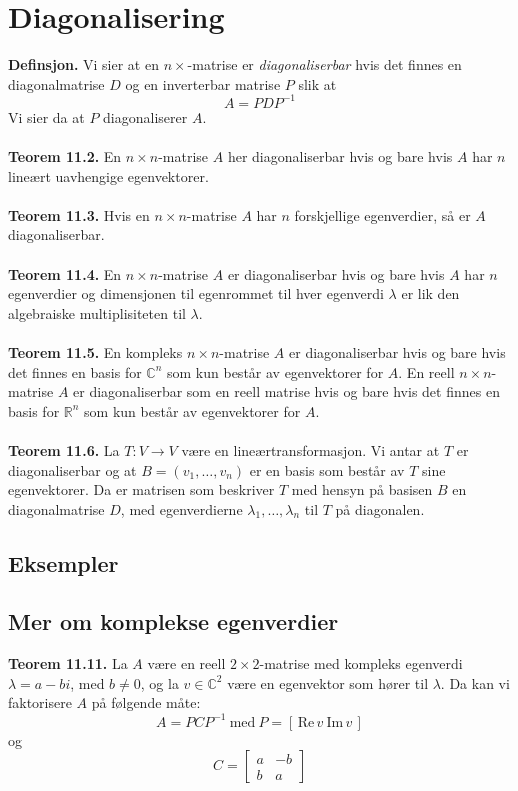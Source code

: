 \documentclass{article}
\begin{document}
\section{Diagonalisering}
\textbf{Definsjon.} Vi sier at en $n \times $-matrise er \textit{diagonaliserbar} hvis det finnes en diagonalmatrise $D$ og en inverterbar matrise $P$ slik at
\[ A = PDP^{-1} \]
Vi sier da at $P$ diagonaliserer $A$.
\\\\
\textbf{Teorem 11.2.} En $n \times n$-matrise $A$ her diagonaliserbar hvis og bare hvis $A$ har $n$ lineært uavhengige egenvektorer.
\\\\
\textbf{Teorem 11.3.} Hvis en $n \times n$-matrise $A$ har $n$ forskjellige egenverdier, så er $A$ diagonaliserbar.
\\\\
\textbf{Teorem 11.4.} En $n \times n$-matrise $A$ er diagonaliserbar hvis og bare hvis $A$ har $n$ egenverdier og dimensjonen til egenrommet til hver egenverdi $\lambda$ er lik den algebraiske multiplisiteten til $\lambda$.
\\\\
\textbf{Teorem 11.5.} En kompleks $n \times n$-matrise $A$ er diagonaliserbar hvis og bare hvis det finnes en basis for $\mathbb{C}^n$ som kun består av egenvektorer for $A$. En reell $n \times n$-matrise $A$ er diagonaliserbar som en reell matrise hvis og bare hvis det finnes en basis for $\mathbb{R}^n$ som kun består av egenvektorer for $A$.
\\\\
\textbf{Teorem 11.6.} La $T: V \rightarrow V$ være en lineærtransformasjon. Vi antar at $T$ er diagonaliserbar og at $B = (v_1, \dots, v_n)$ er en basis som består av $T$ sine egenvektorer. Da er matrisen som beskriver $T$ med hensyn på basisen $B$ en diagonalmatrise $D$, med egenverdierne $\lambda_1, \dots, \lambda_n$ til $T$ på diagonalen.


\subsection{Eksempler}


\subsection{Mer om komplekse egenverdier}
\textbf{Teorem 11.11.} La $A$ være en reell $2 \times 2$-matrise med kompleks egenverdi $\lambda = a - bi$, med $b \neq 0$, og la $v \in \mathbb{C}^2$ være en egenvektor som hører til $\lambda$. Da kan vi faktorisere $A$ på følgende måte:
\[ A = PCP^{-1} \ \text{med} \ P = [\, \text{Re}\,v \ \text{Im}\,v\,] \]
og
\[ C = \begin{bmatrix}
    a & -b \\ b & a
\end{bmatrix} \]
\end{document}
